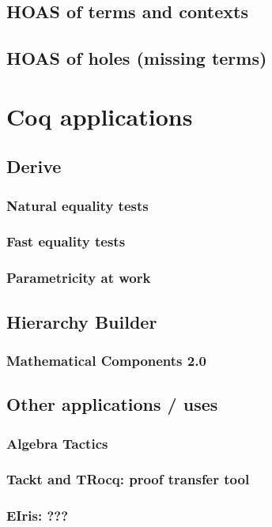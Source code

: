 \documentclass[a4paper, 11pt]{book}
\begin{document}
\section{HOAS of terms and contexts}

\section{HOAS of holes (missing terms)}



\chapter{Coq applications}

\section{Derive}
\subsection{Natural equality tests}
\subsection{Fast equality tests}
\subsection{Parametricity at work}

\section{Hierarchy Builder}
\subsection{Mathematical Components 2.0}

\section{Other applications / uses}
\subsection{Algebra Tactics}
\subsection{Tackt and TRocq: proof transfer tool}
\subsection{EIris: ???}
\end{document}
